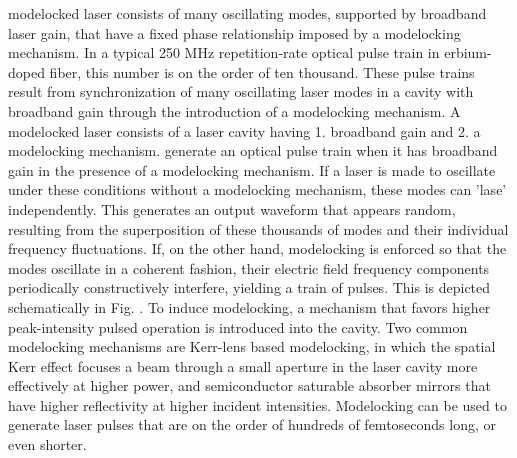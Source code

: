 modelocked laser consists of many oscillating modes, supported by broadband laser gain, that have a fixed phase relationship imposed by a modelocking mechanism. In a typical 250 MHz repetition-rate optical pulse train in erbium-doped fiber, this number is on the order of ten thousand.  These pulse trains result from synchronization of many oscillating laser modes in a cavity with broadband gain through the introduction of a modelocking mechanism. A modelocked laser consists of a laser cavity having 1. broadband gain and 2. a modelocking mechanism. generate an optical pulse train when it has broadband gain in the presence of a modelocking mechanism. If a laser is made to oscillate under these conditions without a modelocking mechanism, these modes can 'lase' independently. This generates an output waveform that appears random, resulting from the superposition of these thousands of modes and their individual frequency fluctuations. If, on the other hand, modelocking is enforced so that the modes oscillate in a coherent fashion, their electric field frequency components periodically constructively interfere, yielding a train of pulses. This is depicted schematically in Fig. \cite{fig:MLnoMLpulsetrains}. To induce modelocking, a mechanism that favors higher peak-intensity pulsed operation is introduced into the cavity. Two common modelocking mechanisms are Kerr-lens based modelocking, in which the spatial Kerr effect focuses a  beam through a small aperture in the laser cavity more effectively at higher power, and semiconductor saturable absorber mirrors that have higher reflectivity at higher incident intensities. Modelocking can be used to generate laser pulses that are on the order of hundreds of femtoseconds long, or even shorter.





%
%
%
%

